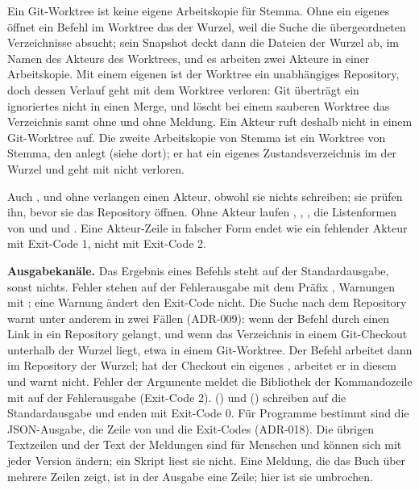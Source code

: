 Ein Git-Worktree ist keine eigene Arbeitskopie für Stemma. Ohne ein eigenes 
öffnet ein Befehl im Worktree das  der Wurzel, weil die Suche die übergeordneten
Verzeichnisse absucht; sein Snapshot deckt dann die Dateien der Wurzel ab, im Namen des Akteurs
des Worktrees, und es arbeiten zwei Akteure in einer Arbeitskopie. Mit einem eigenen
 ist der Worktree ein unabhängiges Repository, doch dessen Verlauf geht mit
dem Worktree verloren: Git überträgt ein ignoriertes  nicht in einen Merge,
und  löscht bei einem sauberen Worktree das Verzeichnis samt
 ohne  und ohne Meldung.
Ein Akteur ruft  deshalb nicht in einem Git-Worktree auf.
Die zweite Arbeitskopie von Stemma ist ein Worktree von Stemma, den  anlegt
(siehe dort); er hat ein eigenes Zustandsverzeichnis im  der Wurzel und geht mit
 nicht verloren.

Auch ,  und  ohne 
verlangen einen Akteur,
obwohl sie nichts schreiben; sie prüfen ihn, bevor sie das Repository öffnen.
Ohne Akteur laufen , , , die Listenformen von
 und  und .
Eine Akteur-Zeile in falscher Form endet wie ein fehlender Akteur mit Exit-Code 1,
nicht mit Exit-Code 2.

{\bf Ausgabekanäle.} Das Ergebnis eines Befehls steht auf der Standardausgabe, sonst nichts.
Fehler stehen auf der Fehlerausgabe mit dem Präfix , Warnungen mit
; eine Warnung ändert den Exit-Code nicht.
Die Suche nach dem Repository warnt unter anderem in zwei Fällen (ADR-009):
wenn der Befehl durch einen Link in ein Repository gelangt,
und wenn das Verzeichnis in einem Git-Checkout unterhalb der Wurzel liegt,
etwa in einem Git-Worktree.
Der Befehl arbeitet dann im Repository der Wurzel;
hat der Checkout ein eigenes , arbeitet er in diesem und warnt nicht.
Fehler der Argumente meldet die Bibliothek der Kommandozeile mit  auf der
Fehlerausgabe (Exit-Code 2).  () und  ()
schreiben auf die Standardausgabe und enden mit Exit-Code 0.
Für Programme bestimmt sind die JSON-Ausgabe, die Zeile  von 
und die Exit-Codes (ADR-018). Die übrigen Textzeilen und der Text der Meldungen sind für
Menschen und können sich mit jeder Version ändern; ein Skript liest sie nicht.
Eine Meldung, die das Buch über mehrere Zeilen zeigt, ist in der Ausgabe eine Zeile;
hier ist sie umbrochen.

